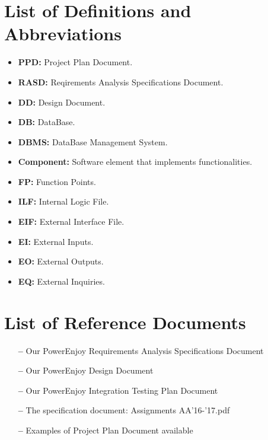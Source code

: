 \section{List of Definitions and Abbreviations}

\begin{itemize}
\item \textbf{PPD:} Project Plan Document.
\item \textbf{RASD:} Reqirements Analysis Specifications Document.
\item \textbf{DD:} Design Document.
\item \textbf{DB:} DataBase.
\item \textbf{DBMS:} DataBase Management System.
\item \textbf{Component:} Software element that implements functionalities.
\item \textbf{FP:} Function Points.
\item \textbf{ILF:} Internal Logic File.
\item \textbf{EIF:} External Interface File.
\item \textbf{EI:} External Inputs.
\item \textbf{EO:} External Outputs.
\item \textbf{EQ:} External Inquiries.

\end{itemize}

\section{List of Reference Documents}

\begin{itemize}
\item[\textbf{--}] Our PowerEnjoy Requirements Analysis Specifications Document
\item[\textbf{--}] Our PowerEnjoy Design Document
\item[\textbf{--}] Our PowerEnjoy Integration Testing Plan Document
\item[\textbf{--}] The specification document: Assignments AA'16-'17.pdf
\item[\textbf{--}] Examples of Project Plan Document available
\end{itemize}